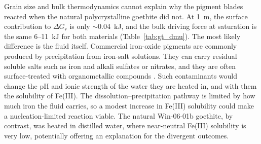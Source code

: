 Grain size and bulk thermodynamics cannot explain why the pigment blades reacted when the natural 
polycrystalline goethite did not. At 1~\textmu m, the surface contribution to $\Delta G_r$ is only
$\sim$0.04~kJ, and the bulk driving force at saturation is the same 6--11~kJ for both materials
(Table~\ref{tab:gt_dmu}). The most likely difference is the fluid itself. Commercial iron-oxide
pigments are commonly produced by precipitation from iron-salt solutions. They can carry
residual soluble salts such as iron and alkali sulfates or nitrates, and they are often surface-treated with 
organometallic compounds \citep{legodi2007,almeidasilva2017,xu2021}. Such contaminants would
change the pH and ionic strength of the water they are heated in, and with them the solubility
of Fe(III). The dissolution--precipitation pathway is limited by how much iron the fluid
carries, so a modest increase in Fe(III) solubility could make a nucleation-limited reaction
viable. The natural Win-06-01b goethite, by contrast, was heated in
distilled water, where near-neutral Fe(III) solubility is very low, potentially offering an explanation for
the divergent outcomes.
